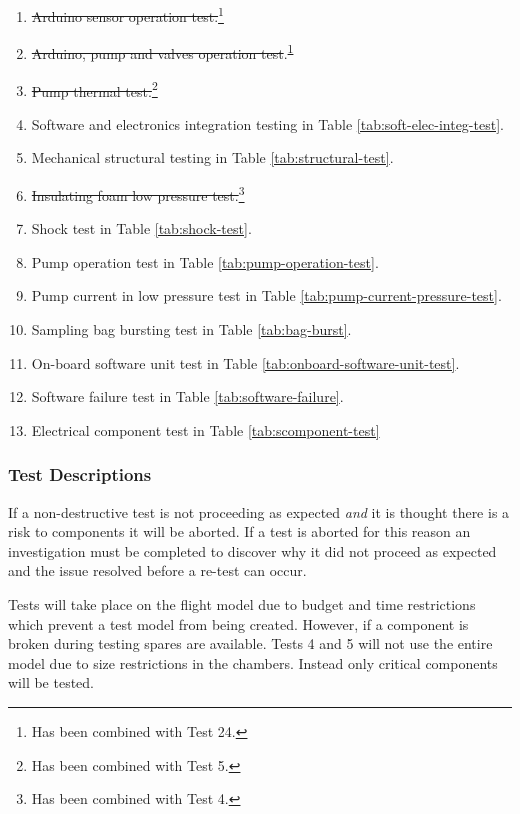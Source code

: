 \documentclass[a4paper,12pt,oneside]{article} %
\begin{document}
\begin{enumerate}
    \item \st{Arduino sensor operation test.}\footnote{Has been combined with Test 24.\label{fn:test-combined24}}
    \item \st{Arduino, pump and valves operation test}.\textsuperscript{\ref{fn:test-combined24}}
    \item \st{Pump thermal test.}\footnote{Has been combined with Test 5.\label{fn:test-combined5}}
    \item Software and electronics integration testing in Table \ref{tab:soft-elec-integ-test}.
    \item Mechanical structural testing in Table \ref{tab:structural-test}.
    \item \st{Insulating foam low pressure test.}\footnote{Has been combined with Test 4.\label{fn:test-combined4}}
    \item Shock test in Table \ref{tab:shock-test}.
    \item Pump operation test in Table \ref{tab:pump-operation-test}.
    \item Pump current in low pressure test in Table \ref{tab:pump-current-pressure-test}.
    \item Sampling bag bursting test in Table \ref{tab:bag-burst}.
    \item On-board software unit test in Table \ref{tab:onboard-software-unit-test}.
    \item Software failure test in Table \ref{tab:software-failure}.
    \item Electrical component test in Table \ref{tab:scomponent-test}
\end{enumerate}

\subsubsection{Test Descriptions}

If a non-destructive test is not proceeding as expected \textit{and} it is thought there is a risk to components it will be aborted. If a test is aborted for this reason an investigation must be completed to discover why it did not proceed as expected and the issue resolved before a re-test can occur.

Tests will take place on the flight model due to budget and time restrictions which prevent a test model from being created. However, if a component is broken during testing spares are available. Tests 4 and 5 will not use the entire model due to size restrictions in the chambers. Instead only critical components will be tested.
\end{document}
